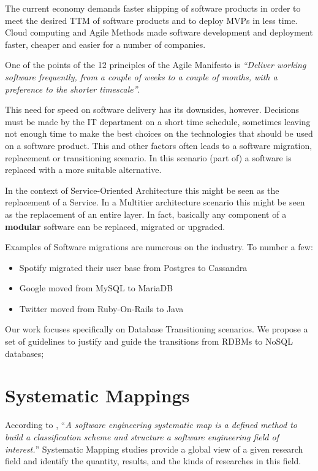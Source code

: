 The current economy demands faster shipping of software products in order to meet the desired TTM of software products and to deploy MVPs in less time. Cloud computing and Agile Methods made software development and deployment faster, cheaper and easier for a number of companies. 

One of the points of the 12 principles of the Agile Manifesto \cite{fowler2001agile} is \textit{``Deliver working software frequently, from a couple of weeks to a couple of months, with a preference to the shorter timescale''}.

This need for speed on software delivery has its downsides, however. Decisions must be made by the IT department on a short time schedule, sometimes leaving not enough time to make the best choices on the technologies that should be used on a software product. This and other factors often leads to a software migration, replacement or transitioning scenario. In this scenario (part of) a software is replaced with a more suitable alternative.

In the context of Service-Oriented Architecture this might be seen as the replacement of a Service. In a Multitier architecture scenario this might be seen as the replacement of an entire layer. In fact, basically any component of a \textbf{modular} software can be replaced, migrated or upgraded. 

Examples of Software migrations are numerous on the industry. To number a few: 
\begin{itemize}
\item{Spotify migrated their user base from Postgres to Cassandra\cite{spotifyEngineering}}
\item{Google moved from MySQL to MariaDB \cite{googleMariaDB}}
\item{Twitter moved from Ruby-On-Rails to Java \cite{twitterRails}}
\end{itemize}

Our work focuses specifically on Database Transitioning scenarios. We propose a set of guidelines to justify and guide the transitions from RDBMs to NoSQL databases;

\section{Systematic Mappings}
According to \cite{Petersen:2008:SMS:2227115.2227123}, ``\textit{A software engineering systematic map is a defined method to build a classification scheme and structure a software engineering field of interest.}''
Systematic Mapping studies provide a global view of a given research field and identify the quantity, results, and the kinds of researches in this field.

